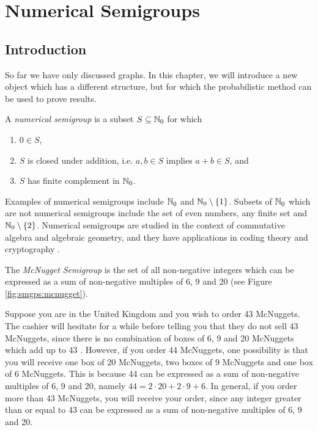 \chapter{Numerical Semigroups}\label{chap:smgs}

\section{Introduction}\label{sec:smgps:intro}

So far we have only discussed graphs. In this chapter, we will introduce a new object which has a different structure, but for which the probabilistic method can be used to prove results. \par

\begin{definition} \cite{rosales2009numerical}
    A \textit{numerical semigroup} is a subset $S \subseteq \mathbb{N}_{0}$ for which 
    \begin{enumerate}
        \item $0 \in S$,
        \item $S$ is closed under addition, i.e. $a, b \in S$ implies $a + b \in S$, and
        \item $S$ has finite complement in $\mathbb{N}_{0}$.
    \end{enumerate}
\end{definition}

Examples of numerical semigroups include $\mathbb{N}_{0}$ and $\mathbb{N}_{0} \setminus \{1\}$. Subsets of $\mathbb{N}_0$ which are not numerical semigroups include the set of even numbers, any finite set and $\mathbb{N}_0 \setminus \{2\}$. Numerical semigroups are studied in the context of commutative algebra and algebraic geometry, and they have applications in coding theory and cryptography \cite{assi2020numerical}. \par

\begin{example}\label{ex:smgps:mcnugget}
    The \textit{McNugget Semigroup} is the set of all non-negative integers which can be expressed as a sum of non-negative multiples of 6, 9 and 20 (see Figure \ref{fig:smgps:mcnugget}).
\end{example}

Suppose you are in the United Kingdom and you wish to order 43 McNuggets. The cashier will hesitate for a while before telling you that they do not sell 43 McNuggets, since there is no combination of boxes of 6, 9 and 20 McNuggets which add up to 43 \cite{youtube}. However, if you order 44 McNuggets, one possibility is that you will receive one box of 20 McNuggets, two boxes of 9 McNuggets and one box of 6 McNuggets. This is because 44 can be expressed as a sum of non-negative multiples of 6, 9 and 20, namely $44 = 2 \cdot 20 + 2 \cdot 9 + 6$. In general, if you order more than 43 McNuggets, you will receive your order, since any integer greater than or equal to 43 can be expressed as a sum of non-negative multiples of 6, 9 and 20. \par

